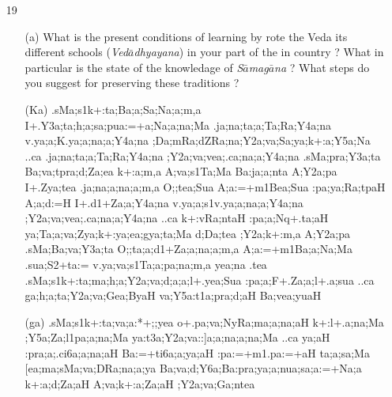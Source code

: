 {\begin{itemize}
  \item[19] \begin{itemize}
            
            \item[(a)] What is the present conditions of learning by rote the Veda its different schools ({\textit {Ved$\bar{a}$dhyayana}}) in your part of the in country ? What in particular is the state of the knowledage of {\textit {S$\bar{a}$mag$\bar{a}$na}} ? What steps do you suggest for preserving these traditions ?
\end{itemize}
\end{itemize}
}

\begin{itemize} 
\item[]		 \begin{itemize}               
                \item[({\sktf Ka})] {\sktf .sMa;s1k+:ta;Ba;a;Sa;Na;a;m,a I+.Y3a;ta;h;a;sa;pua:=+a;Na;a;na;Ma
.ja;na;ta;a;Ta;Ra;Y4a;na v.ya;a;K.ya;a;na;a;Y4a;na\ZF{,} ;Da;mRa{;d}{ZRa};na;Y2a;va;Sa;ya;k+:a;Y5a;Na ..ca .ja;na;ta;a;Ta;Ra;Y4a;na
;Y2a;va;vea;.ca;na;a;Y4a;na .sMa;pra;Y3a;ta Ba;va;tpra;d;Za;ea
k+:a;m,a A;va;s1Ta;Ma Ba:ja;a;nta A;Y2a;pa I+.Zya;tea
.ja;na;a;na;a;m,a O;{;tea};Sua {A;a}:=+m1Bea;Sua :pa;ya;Ra;tpaH A;a;d:=H
I+.d1+Za;a;Y4a;na v.ya;a;s1v.ya;a;na;a;Y4a;na
;Y2a;va;vea;.ca;na;a;Y4a;na ..ca k+:vRa;ntaH
:pa;a;Nq+.ta;aH ya;Ta;a;va;Zya;k+:ya;ea;gya{;ta;Ma} d;Da{;tea} ;Y2a;k+:m,a A;Y2a;pa .sMa;Ba;va;Y3a;ta
O;;ta;a;d1+Za;a;na;a;m,a A;a:=+m1Ba;a;Na;Ma .sua;S2+ta:=
v.ya;va;s1Ta;a;pa;na;m,a\ZF{,} yea;na .tea .sMa;s1k+:ta;ma;h;a;Y2a;va;d;a;a;l{+.yea};Sua :pa;a{;F}+.Za;a;l+.a;sua ..ca ga;h;a;ta;Y2a;va;Gea;ByaH%
 va;Y5a:t1a;pra;d;aH Ba;vea;yuaH}
                
                \item[({\sktf ga})] {\sktf .sMa;s1k+:ta;va;a:*+;;yea
o+.pa;va;NyRa;ma;a;na;aH k+:l+.a;na;Ma\ZF{,} ;Y5a;Za;l1pa;a;na;Ma\ZF{,}
ya:t3a;Y2a;va::]a;a;na;a;na;Ma ..ca ya;aH :pra;a;.ci6a;a;na;aH Ba:=+ti6a;a;ya;aH
:pa:=+m1.pa:=+aH\ZF{,} ta;a;sa;Ma [ea;ma;sMa;va;DRa;na;a;ya
Ba;va;d;Y6a;Ba\ZF{-}:pra;ya;a;nua;sa;a:=+Na;a
k+:a;d;Za;aH A;va;k+:a;Za;aH ;Y2a;va;Ga;ntea} 
                

\end{itemize}
\end{itemize}
